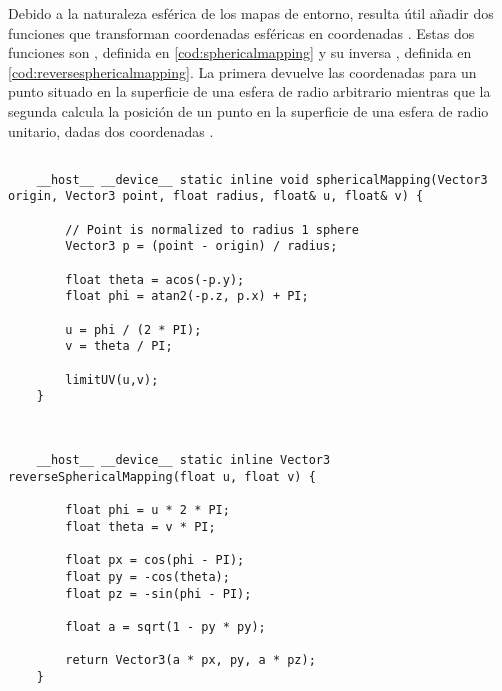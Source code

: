 Debido a la naturaleza esférica de los mapas de entorno, resulta útil añadir dos funciones que transforman coordenadas esféricas en coordenadas . Estas dos funciones son , definida en \autoref{cod:sphericalmapping} y su inversa , definida en \autoref{cod:reversesphericalmapping}. La primera devuelve las coordenadas  para un punto situado en la superficie de una esfera de radio arbitrario mientras que la segunda calcula la posición de un punto en la superficie de una esfera de radio unitario, dadas dos coordenadas .

\label{sphericalmapping}

\begin{minipage}[c]{0.95\textwidth}
\begin{lstlisting}[label={cod:sphericalmapping}, caption={Código para calcular las coordenadas u,v a través de un vector en una esfera de radio determinado.}]
	
    __host__ __device__ static inline void sphericalMapping(Vector3 origin, Vector3 point, float radius, float& u, float& v) {

        // Point is normalized to radius 1 sphere
        Vector3 p = (point - origin) / radius;

        float theta = acos(-p.y);
        float phi = atan2(-p.z, p.x) + PI;

        u = phi / (2 * PI);
        v = theta / PI;

        limitUV(u,v);
    }
	
\end{lstlisting}
\end{minipage}

\begin{minipage}[c]{0.95\textwidth}
\begin{lstlisting}[label={cod:reversesphericalmapping}, caption={Función inversa al mapeo esférico.}]
		
	__host__ __device__ static inline Vector3 reverseSphericalMapping(float u, float v) {

        float phi = u * 2 * PI;
        float theta = v * PI;

        float px = cos(phi - PI);
        float py = -cos(theta);
        float pz = -sin(phi - PI);

        float a = sqrt(1 - py * py);

        return Vector3(a * px, py, a * pz);
    }
	
\end{lstlisting}
\end{minipage}


